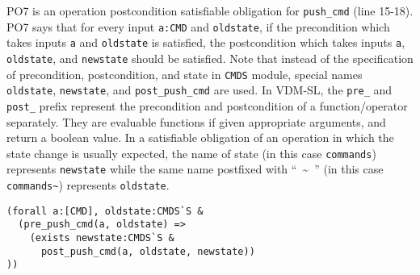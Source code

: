 PO7 is an operation postcondition satisfiable obligation for {\tt push\_cmd} (line 15-18). PO7 says that for every input {\tt a:CMD} and {\tt oldstate}, if the precondition which takes inputs {\tt a} and {\tt oldstate} is satisfied, the postcondition which takes inputs {\tt a}, {\tt oldstate}, and {\tt newstate} should be satisfied. Note that instead of the specification of precondition, postcondition, and state in {\tt CMDS} module, special names {\tt oldstate}, {\tt newstate}, and {\tt post\_push\_cmd} are used. In VDM-SL, the {\tt pre\_} and {\tt post\_} prefix represent the precondition and postcondition of a function/operator separately. They are evaluable functions if given appropriate arguments, and return a boolean value. In a satisfiable obligation of an operation in which the state change is usually expected, the name of state (in this case {\tt commands}) represents {\tt newstate} while the same name postfixed with ``~\textasciitilde~'' (in this case {\tt commands\textasciitilde}) represents {\tt oldstate}.

\begin{mdframed}[roundcorner=5pt]
\begin{Verbatim}[fontsize=\small]
(forall a:[CMD], oldstate:CMDS`S & 
  (pre_push_cmd(a, oldstate) => 
    (exists newstate:CMDS`S & 
      post_push_cmd(a, oldstate, newstate))
))
\end{Verbatim}
\end{mdframed}

